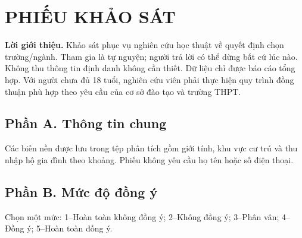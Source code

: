 \chapter{PHIẾU KHẢO SÁT}
\textbf{Lời giới thiệu.} Khảo sát phục vụ nghiên cứu học thuật về quyết định chọn trường/ngành. Tham gia là tự nguyện; người trả lời có thể dừng bất cứ lúc nào. Không thu thông tin định danh không cần thiết. Dữ liệu chỉ được báo cáo tổng hợp. Với người chưa đủ 18 tuổi, nghiên cứu viên phải thực hiện quy trình đồng thuận phù hợp theo yêu cầu của cơ sở đào tạo và trường THPT.

\section*{Phần A. Thông tin chung}
Các biến nền được lưu trong tệp phân tích gồm giới tính, khu vực cư trú và thu nhập hộ gia đình theo khoảng. Phiếu không yêu cầu họ tên hoặc số điện thoại.

\section*{Phần B. Mức độ đồng ý}
Chọn một mức: 1--Hoàn toàn không đồng ý; 2--Không đồng ý; 3--Phân vân; 4--Đồng ý; 5--Hoàn toàn đồng ý.

